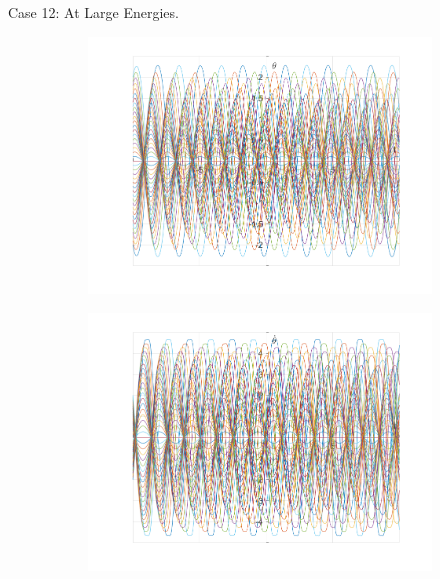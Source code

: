 \documentclass{article}
\begin{document}
	Case 12:
	At Large Energies.	
	\begin{figure}[h!]
		\centering
		\begin{subfigure}[b]{0.48\linewidth}
			\includegraphics[width=\linewidth]{./SmallOscillations/Chaotic/F1.png}
		\end{subfigure}
		\begin{subfigure}[b]{0.48\linewidth}
			\includegraphics[width=\linewidth]{./SmallOscillations/Chaotic/F2.png}
		\end{subfigure}
	\end{figure}
	
\end{document}
